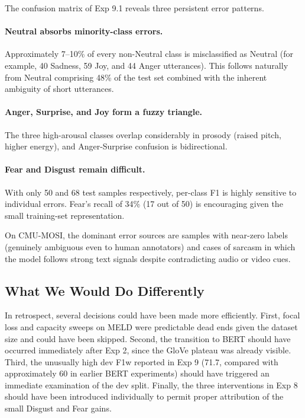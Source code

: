 \documentclass[11pt,twocolumn]{article}
\begin{document}
The confusion matrix of Exp 9.1 reveals three persistent error patterns.

\paragraph{Neutral absorbs minority-class errors.} Approximately 7--10\% of every non-Neutral class is misclassified as Neutral (for example, 40 Sadness, 59 Joy, and 44 Anger utterances). This follows naturally from Neutral comprising 48\% of the test set combined with the inherent ambiguity of short utterances.

\paragraph{Anger, Surprise, and Joy form a fuzzy triangle.} The three high-arousal classes overlap considerably in prosody (raised pitch, higher energy), and Anger-Surprise confusion is bidirectional.

\paragraph{Fear and Disgust remain difficult.} With only 50 and 68 test samples respectively, per-class F1 is highly sensitive to individual errors. Fear's recall of 34\% (17 out of 50) is encouraging given the small training-set representation.

On CMU-MOSI, the dominant error sources are samples with near-zero labels (genuinely ambiguous even to human annotators) and cases of sarcasm in which the model follows strong text signals despite contradicting audio or video cues.

\subsection{What We Would Do Differently}

In retrospect, several decisions could have been made more efficiently. First, focal loss and capacity sweeps on MELD were predictable dead ends given the dataset size and could have been skipped. Second, the transition to BERT should have occurred immediately after Exp 2, since the GloVe plateau was already visible. Third, the unusually high dev F1w reported in Exp 9 (71.7, compared with approximately 60 in earlier BERT experiments) should have triggered an immediate examination of the dev split. Finally, the three interventions in Exp 8 should have been introduced individually to permit proper attribution of the small Disgust and Fear gains.
\end{document}
